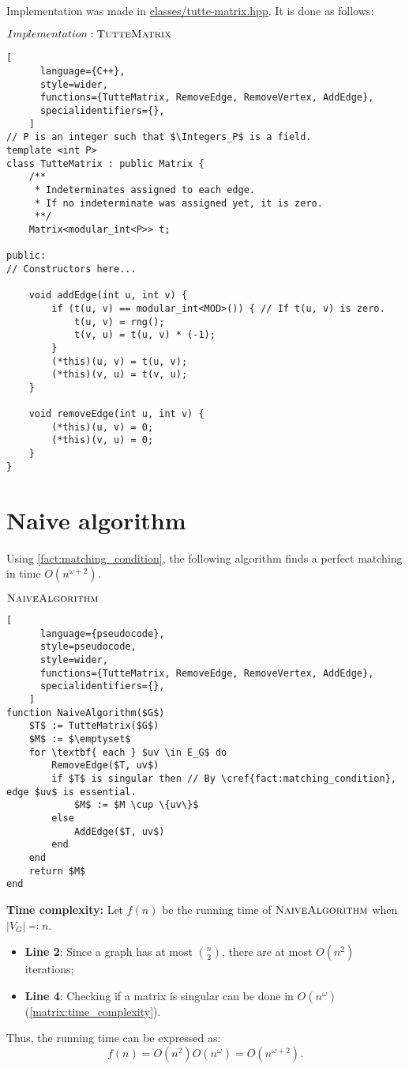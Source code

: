 Implementation was made in \href{https://github.com/antoniomsah/algebraic-max-matching/blob/main/code/classes/tutte-matrix.hpp}{classes/tutte-matrix.hpp}.
It is done as follows:
\begin{programruledcaption}{\(Implementation: \textsc{TutteMatrix}\)}
    \begin{lstlisting}[
      language={C++},
      style=wider,
      functions={TutteMatrix, RemoveEdge, RemoveVertex, AddEdge},
      specialidentifiers={},
    ]
// P is an integer such that $\Integers_P$ is a field.
template <int P>
class TutteMatrix : public Matrix {
    /** 
     * Indeterminates assigned to each edge.
     * If no indeterminate was assigned yet, it is zero.
     **/ 
    Matrix<modular_int<P>> t; 
    
public:
// Constructors here...

    void addEdge(int u, int v) {
        if (t(u, v) == modular_int<MOD>()) { // If t(u, v) is zero.
            t(u, v) = rng();
            t(v, u) = t(u, v) * (-1);
        }
        (*this)(u, v) = t(u, v);
        (*this)(v, u) = t(v, u);
    }

    void removeEdge(int u, int v) {
        (*this)(u, v) = 0;
        (*this)(v, u) = 0;
    }
}
    \end{lstlisting}
\end{programruledcaption}


\section{Naive algorithm}


Using \cref{fact:matching_condition}, the following algorithm finds a perfect matching in time \(O(n^{\omega+2})\).
\begin{programruledcaption}{\(\textsc{NaiveAlgorithm}\)}
    \begin{lstlisting}[
      language={pseudocode},
      style=pseudocode,
      style=wider,
      functions={TutteMatrix, RemoveEdge, RemoveVertex, AddEdge},
      specialidentifiers={},
    ]
function NaiveAlgorithm($G$)
    $T$ := TutteMatrix($G$)
    $M$ := $\emptyset$
    for \textbf{ each } $uv \in E_G$ do
        RemoveEdge($T, uv$)
        if $T$ is singular then // By \cref{fact:matching_condition}, edge $uv$ is essential.
            $M$ := $M \cup \{uv\}$
        else 
            AddEdge($T, uv$)
        end
    end
    return $M$ 
end
    \end{lstlisting}
\end{programruledcaption}
\noindent
\textbf{Time complexity:}
Let \(f(n)\) be the running time of \(\textsc{NaiveAlgorithm}\) when \(|V_G| \eqcolon n\).
\begin{itemize}
    \item \textbf{Line 2}: Since a graph has at most \(\binom{n}{2}\), there are at most \(O(n^2)\) iterations;
    \item \textbf{Line 4}: Checking if a matrix is singular can be done in \(O(n^\omega)\) (\cref{matrix:time_complexity}).
\end{itemize}
Thus, the running time can be expressed as:
\[
    f(n) = O(n^2) O(n^\omega) = O(n^{\omega+2}).
\]

